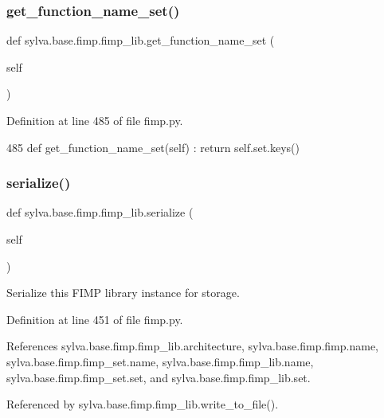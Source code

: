 \subsubsection{\texorpdfstring{get\+\_\+function\+\_\+name\+\_\+set()}{get\_function\_name\_set()}}
{\footnotesize\ttfamily def sylva.\+base.\+fimp.\+fimp\+\_\+lib.\+get\+\_\+function\+\_\+name\+\_\+set (\begin{DoxyParamCaption}\item[{}]{self }\end{DoxyParamCaption})}



Definition at line 485 of file fimp.\+py.


\begin{DoxyCode}
485     \textcolor{keyword}{def }get\_function\_name\_set(self) : \textcolor{keywordflow}{return} self.set.keys()
\end{DoxyCode}
\mbox{\label{classsylva_1_1base_1_1fimp_1_1fimp__lib_ae068ffaae8be2b291ba9b09d8625e308}} 
\subsubsection{\texorpdfstring{serialize()}{serialize()}}
{\footnotesize\ttfamily def sylva.\+base.\+fimp.\+fimp\+\_\+lib.\+serialize (\begin{DoxyParamCaption}\item[{}]{self }\end{DoxyParamCaption})}

\begin{DoxyVerb}  Serialize this FIMP library instance for storage.
\end{DoxyVerb}
 

Definition at line 451 of file fimp.\+py.



References sylva.\+base.\+fimp.\+fimp\+\_\+lib.\+architecture, sylva.\+base.\+fimp.\+fimp.\+name, sylva.\+base.\+fimp.\+fimp\+\_\+set.\+name, sylva.\+base.\+fimp.\+fimp\+\_\+lib.\+name, sylva.\+base.\+fimp.\+fimp\+\_\+set.\+set, and sylva.\+base.\+fimp.\+fimp\+\_\+lib.\+set.



Referenced by sylva.\+base.\+fimp.\+fimp\+\_\+lib.\+write\+\_\+to\+\_\+file().


